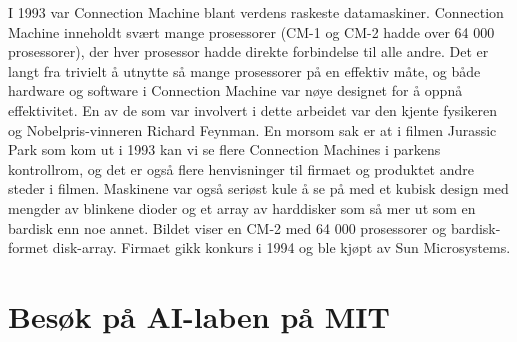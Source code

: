 \documentclass[../../main.tex]{subfiles}
\begin{document}
I 1993 var Connection Machine blant verdens raskeste datamaskiner. Connection Machine inneholdt svært mange prosessorer (CM-1 og CM-2 hadde over 64 000 prosessorer), der hver prosessor hadde direkte forbindelse til alle andre. Det er langt fra trivielt å utnytte så mange prosessorer på en effektiv måte, og både hardware og software i Connection Machine var nøye designet for å oppnå effektivitet. En av de som var involvert i dette arbeidet var den kjente fysikeren og Nobelpris-vinneren Richard Feynman. En morsom sak er at i filmen Jurassic Park som kom ut i 1993 kan vi se flere Connection Machines i parkens kontrollrom, og det er også flere henvisninger til firmaet og produktet andre steder i filmen. Maskinene var også seriøst kule å se på med et kubisk design med mengder av blinkene dioder og et array av harddisker som så mer ut som en bardisk enn noe annet. Bildet viser en CM-2 med 64 000 prosessorer og bardisk-formet disk-array. Firmaet gikk konkurs i 1994 og ble kjøpt av Sun Microsystems. 

\section{Besøk på AI-laben på MIT}
\end{document}
